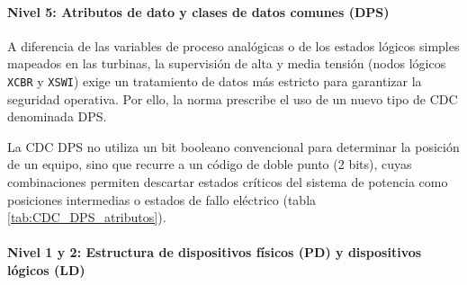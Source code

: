 \paragraph{Nivel 5: Atributos de dato y clases de datos comunes (\ac{DPS})}
\label{sec:sub_nivel5}
A diferencia de las variables de proceso analógicas o de los estados lógicos simples mapeados en las turbinas, la supervisión de alta y media tensión (nodos lógicos \texttt{XCBR} y \texttt{XSWI}) exige un tratamiento de datos más estricto para garantizar la seguridad operativa. Por ello, la norma prescribe el uso de un nuevo tipo de \ac{CDC} denominada \ac{DPS}.

La \ac{CDC} \ac{DPS} no utiliza un bit booleano convencional para determinar la posición de un equipo, sino que recurre a un código de doble punto (2 bits), cuyas combinaciones permiten descartar estados críticos del sistema de potencia como posiciones intermedias o estados de fallo eléctrico (tabla \ref{tab:CDC_DPS_atributos}).

\begin{table}[tb]
    \centering
    \caption{Estructura de atributos y codificación de estados para la Clase de Datos Comunes (DPS) según IEC 61850-7-3.}
    \label{tab:CDC_DPS_atributos}
\end{table}

\paragraph{Nivel 1 y 2: Estructura de dispositivos físicos (PD) y dispositivos lógicos (LD)}
\label{sec:sub_nivel1_2}

